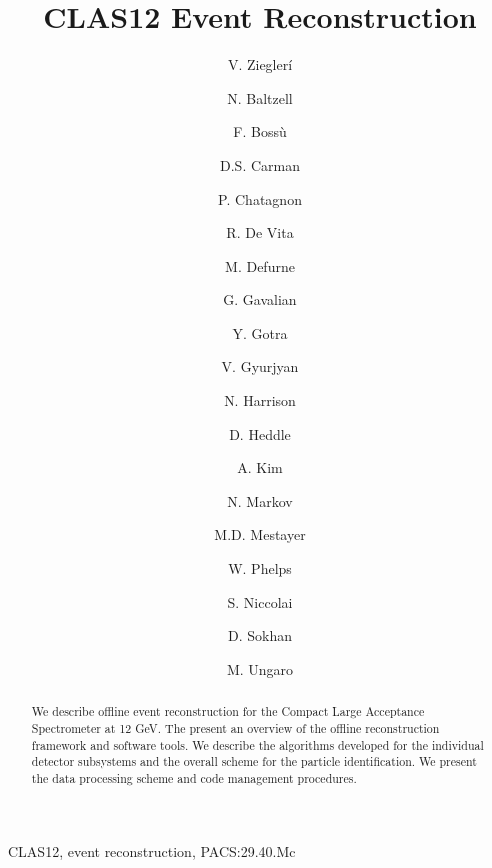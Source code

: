 \documentclass[3p,times,twocolumn]{elsarticle}
\begin{document}
\begin{frontmatter}

\title{CLAS12 Event Reconstruction}

\author[JLab]{V. Ziegler\'i}
\author[JLab]{N. Baltzell}
\author[Saclay]{F. Boss\`u}
\author[JLab]{D.S. Carman}
\author[IPNO]{P. Chatagnon}
\author[INFN]{R. De Vita}
\author[Saclay]{M. Defurne}
\author[JLab]{G. Gavalian}
\author[JLab]{Y. Gotra}
\author[JLab]{V. Gyurjyan}
\author[JLab]{N. Harrison}
\author[CNU]{D. Heddle}
\author[UConn]{A. Kim}
\author[JLab]{N. Markov}
\author[JLab]{M.D. Mestayer}
\author[CNU]{W. Phelps}
\author[IPNO]{S. Niccolai}
\author[Glasgow]{D. Sokhan}
\author[JLab]{M. Ungaro}

\address[JLab]{Thomas Jefferson National Accelerator Facility, Newport News, VA 23606, USA}
\address[CNU]{Christopher Newport University, 1 Avenue of the Arts, Newport News, 23606 VA , USA}
\address[UConn]{University of Connecticut, Storrs, CT 06269, USA}
\address[INFN]{INFN, Sezione di Genova, 16146 Genova, Italy}
\address[Saclay]{CEA-Saclay, Univ. Paris-Sud, Universit\'e Paris-Saclay, Gif-sur-Yvettes, France}
\address[IPNO]{Institut de Physique Nucl\'eaire, CNRS-IN2P3, Univ. Paris-Sud, Universit\'e Paris-Saclay,
91406 Orsay Cedex, France}
\address[Glasgow]{University of Glasgow, Glasgow G12 8QQ, United Kingdom}



\begin{abstract}
We describe offline event reconstruction for the Compact Large Acceptance Spectrometer at 12 GeV.
The present an overview of the offline reconstruction framework and software tools.
We describe the algorithms developed for the individual detector subsystems and the overall scheme for the
particle identification.  We present the data processing scheme and code management procedures.
\end{abstract}

\begin{keyword}
CLAS12, event reconstruction, PACS:29.40.Mc
\end{keyword}

\end{frontmatter}
\end{document}

